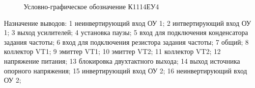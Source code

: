 \begin{figure}[ht]
  
  \caption{Условно-графическое обозначение К1114ЕУ4}
  \label{img:k1114eu4}
\end{figure}

Назначение выводов:
1 \longndash неинвертирующий вход ОУ 1;
2 \longndash интвертирующий вход ОУ 1;
3 \longndash выход усилителей;
4 \longndash установка паузы;
5 \longndash вход для подключения конденсатора задания частоты;
6 \longndash вход для подключения резистора задания частоты;
7 \longndash общий;
8 \longndash коллектор VT1;
9 \longndash эмиттер VT1;
10 \longndash эмиттер VT2;
11 \longndash коллектор VT2;
12 \longndash напряжение питания;
13 \longndash блокировка двухтактного выхода;
14 \longndash выход источника опорного напряжения;
15 \longndash инвертирующий вход ОУ 2;
16 \longndash неинвертирующий вход ОУ 2; 

